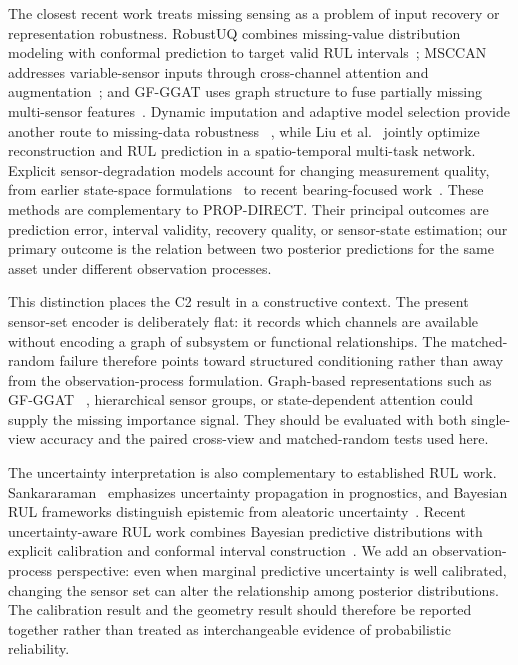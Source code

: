 The closest recent work treats missing sensing as a problem of input recovery or
representation robustness. RobustUQ combines missing-value distribution modeling
with conformal prediction to target valid RUL intervals~\citep{wang2025robustuq};
MSCCAN addresses variable-sensor inputs through cross-channel attention and
augmentation~\citep{zhang2025msccan}; and GF-GGAT uses graph structure to fuse
partially missing multi-sensor features~\citep{wang2025gfggat}. Dynamic imputation
and adaptive model selection provide another route to missing-data robustness
~\citep{niu2026dynamic}, while Liu et al.~\citep{liu2026strsmtnet} jointly optimize
reconstruction and RUL prediction in a spatio-temporal multi-task network. Explicit
sensor-degradation models account for changing measurement quality, from earlier
state-space formulations~\citep{mukhopadhyay2023degradingsensors,hachem2024sensordegradation}
to recent bearing-focused work~\citep{zhao2026sensordegradation}. These methods are
complementary to PROP-DIRECT. Their principal outcomes are prediction error, interval
validity, recovery quality, or sensor-state estimation; our primary outcome is the
relation between two posterior predictions for the same asset under different
observation processes.

This distinction places the C2 result in a constructive context. The present
sensor-set encoder is deliberately flat: it records which channels are available
without encoding a graph of subsystem or functional relationships. The matched-random
failure therefore points toward structured conditioning rather than away from the
observation-process formulation. Graph-based representations such as GF-GGAT
~\citep{wang2025gfggat}, hierarchical sensor groups, or state-dependent attention
could supply the missing importance signal. They should be evaluated with both
single-view accuracy and the paired cross-view and matched-random tests used here.

The uncertainty interpretation is also complementary to established RUL work.
Sankararaman~\citep{sankararaman201501405029} emphasizes uncertainty propagation in
prognostics, and Bayesian RUL frameworks distinguish epistemic from aleatoric
uncertainty~\citep{li202103009593}. Recent uncertainty-aware RUL work combines
Bayesian predictive distributions with explicit calibration and conformal interval
construction~\citep{xu2026calibratedrul}. We add an observation-process perspective:
even when marginal predictive uncertainty is well calibrated, changing the sensor
set can alter the relationship among posterior distributions. The calibration result
and the geometry result should therefore be reported together rather than treated as
interchangeable evidence of probabilistic reliability.

